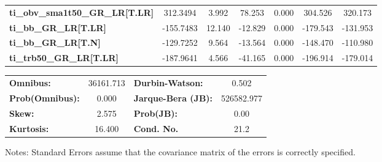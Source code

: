 \begin{center}
\begin{tabular}{lcccccc}
\textbf{ti\_obv\_sma1t50\_GR\_LR[T.LR]} &     312.3494  &        3.992     &    78.253  &         0.000        &      304.526    &      320.173     \\
\textbf{ti\_bb\_GR\_LR[T.LR]}           &    -155.7483  &       12.140     &   -12.829  &         0.000        &     -179.543    &     -131.953     \\
\textbf{ti\_bb\_GR\_LR[T.N]}            &    -129.7252  &        9.564     &   -13.564  &         0.000        &     -148.470    &     -110.980     \\
\textbf{ti\_trb50\_GR\_LR[T.LR]}        &    -187.9641  &        4.566     &   -41.165  &         0.000        &     -196.914    &     -179.014     \\
\bottomrule
\end{tabular}
\begin{tabular}{lclc}
\textbf{Omnibus:}       & 36161.713 & \textbf{  Durbin-Watson:     } &     0.502   \\
\textbf{Prob(Omnibus):} &    0.000  & \textbf{  Jarque-Bera (JB):  } & 526582.977  \\
\textbf{Skew:}          &    2.575  & \textbf{  Prob(JB):          } &      0.00   \\
\textbf{Kurtosis:}      &   16.400  & \textbf{  Cond. No.          } &      21.2   \\
\bottomrule
\end{tabular}
\end{center}

Notes: \newline
 [1] Standard Errors assume that the covariance matrix of the errors is correctly specified.

